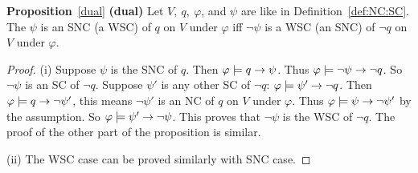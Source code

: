 \documentclass[twoside,11pt]{article}
\begin{document}
	
	\noindent\textbf{Proposition}~\ref{dual} \textbf{(dual)}  Let $V,\ q,\ \varphi$, and $\psi$ are like in Definition~\ref{def:NC:SC}.
	The $\psi$ is an SNC (a WSC) of $q$ on $V$ under $\varphi$ iff $\neg \psi$ is a WSC (an SNC)
	of $\neg q$ on $V$ under $\varphi$.\\
	\begin{proof}
		(i) Suppose $\psi$ is the SNC of $q$. Then $\varphi \models q \rightarrow \psi$. Thus $\varphi \models \neg \psi \rightarrow \neg q$. So $\neg \psi$ is an
		SC of $\neg q$. Suppose $\psi'$ is any other SC of $\neg q$: $\varphi \models \psi' \rightarrow \neg q$. Then $\varphi \models q \rightarrow \neg \psi'$, this means $\neg \psi'$ is an NC of $q$ on $V$ under $\varphi$.
		Thus $\varphi \models \psi \rightarrow \neg \psi'$ by the assumption. So $\varphi \models \psi' \rightarrow \neg \psi$. This proves that $\neg \psi$ is the WSC of $\neg q$.
		The proof of the other part of the proposition is similar.
		
		(ii) The WSC case can be proved similarly with SNC case.
	\end{proof}
	
\end{document}
